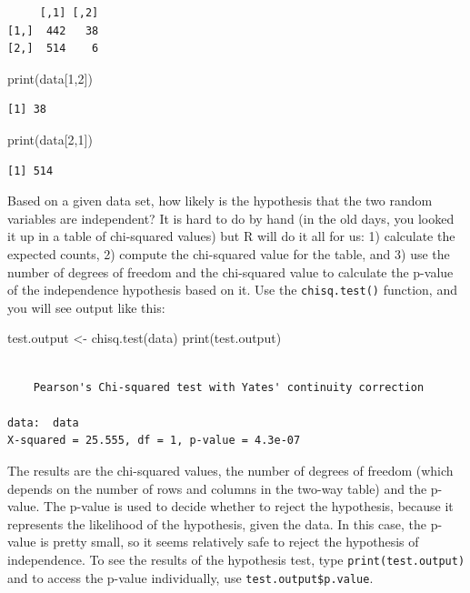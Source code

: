 \documentclass[
  letterpaper,
  DIV=11,
  numbers=noendperiod]{scrreprt}
\newenvironment{Shaded}{\begin{snugshade}}{\end{snugshade}}
\newcommand{\DecValTok}[1]{\textcolor[rgb]{0.68,0.00,0.00}{#1}}
\newcommand{\FunctionTok}[1]{\textcolor[rgb]{0.28,0.35,0.67}{#1}}
\newcommand{\NormalTok}[1]{\textcolor[rgb]{0.00,0.23,0.31}{#1}}
\newcommand{\OtherTok}[1]{\textcolor[rgb]{0.00,0.23,0.31}{#1}}
\begin{document}
\begin{verbatim}
     [,1] [,2]
[1,]  442   38
[2,]  514    6
\end{verbatim}

\begin{Shaded}
\begin{Highlighting}[]
\FunctionTok{print}\NormalTok{(data[}\DecValTok{1}\NormalTok{,}\DecValTok{2}\NormalTok{])}
\end{Highlighting}
\end{Shaded}

\begin{verbatim}
[1] 38
\end{verbatim}

\begin{Shaded}
\begin{Highlighting}[]
\FunctionTok{print}\NormalTok{(data[}\DecValTok{2}\NormalTok{,}\DecValTok{1}\NormalTok{])}
\end{Highlighting}
\end{Shaded}

\begin{verbatim}
[1] 514
\end{verbatim}

Based on a given data set, how likely is the hypothesis that the two
random variables are independent? It is hard to do by hand (in the old
days, you looked it up in a table of chi-squared values) but R will do
it all for us: 1) calculate the expected counts, 2) compute the
chi-squared value for the table, and 3) use the number of degrees of
freedom and the chi-squared value to calculate the p-value of the
independence hypothesis based on it. Use the \texttt{chisq.test()}
function, and you will see output like this:

\begin{Shaded}
\begin{Highlighting}[]
\NormalTok{test.output }\OtherTok{\textless{}{-}} \FunctionTok{chisq.test}\NormalTok{(data)}
\FunctionTok{print}\NormalTok{(test.output)}
\end{Highlighting}
\end{Shaded}

\begin{verbatim}

    Pearson's Chi-squared test with Yates' continuity correction

data:  data
X-squared = 25.555, df = 1, p-value = 4.3e-07
\end{verbatim}

The results are the chi-squared values, the number of degrees of freedom
(which depends on the number of rows and columns in the two-way table)
and the p-value. The p-value is used to decide whether to reject the
hypothesis, because it represents the likelihood of the hypothesis,
given the data. In this case, the p-value is pretty small, so it seems
relatively safe to reject the hypothesis of independence. To see the
results of the hypothesis test, type \texttt{print(test.output)} and to
access the p-value individually, use \texttt{test.output\$p.value}.
\end{document}
